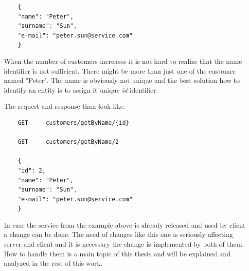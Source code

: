 \begin{lstlisting}
    { 
    "name": "Peter",
    "surname": "Sun",
    "e-mail": "peter.sun@service.com" 
    }
\end{lstlisting}

When the number of customers increases it is not hard to realize that the name identifier is not sufficient. There might be more than just one of the customer named "Peter". The name is obviously not unique and the best solution how to identify an entity is to assign it unique \emph{id} identifier. 

The request and response than look like:
\begin{lstlisting}
    GET     customers/getByName/{id} 
    
    GET     customers/getByName/2 
    
    { 
    "id": 2,
    "name": "Peter",
    "surname": "Sun",
    "e-mail": "peter.sun@service.com" 
    }
\end{lstlisting}


In case the service from the example above is already released and used by client a change can be done. The need of changes like this one is seriously affecting server and client and it is necessary the change is implemented by both of them. How to handle them is a main topic of this thesis and will be explained and analyzed in the rest of this work.

